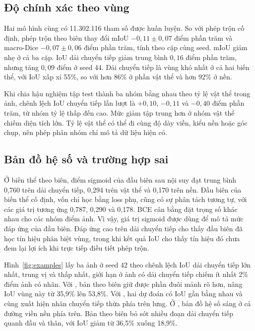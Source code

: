 \subsection{Độ chính xác theo vùng}

Hai mô hình cùng có 11.302.116 tham số được huấn luyện. So với phép trộn cố định, phép trộn theo biên thay đổi mIoU $-0{,}11\pm0{,}07$ điểm phần trăm và macro-Dice $-0{,}07\pm0{,}06$ điểm phần trăm, tính theo cặp cùng seed. mIoU giảm nhẹ ở cả ba cặp. IoU dải chuyển tiếp giảm trung bình $0{,}16$ điểm phần trăm, nhưng tăng $0{,}09$ điểm ở seed 44. Dải chuyển tiếp là vùng khó nhất ở cả hai biến thể, với IoU xấp xỉ 55\%, so với hơn 86\% ở phần vật thể và hơn 92\% ở nền.

Khi chia hậu nghiệm tập test thành ba nhóm bằng nhau theo tỷ lệ vật thể trong ảnh, chênh lệch IoU chuyển tiếp lần lượt là $+0{,}10$, $-0{,}11$ và $-0{,}40$ điểm phần trăm, từ nhóm tỷ lệ thấp đến cao. Mức giảm tập trung hơn ở nhóm vật thể chiếm diện tích lớn. Tỷ lệ vật thể có thể đi cùng độ dày viền, kiểu nền hoặc góc chụp, nên phép phân nhóm chỉ mô tả dữ liệu hiện có.

\subsection{Bản đồ hệ số và trường hợp sai}

Ở biến thể theo biên, điểm sigmoid của đầu biên sau nội suy đạt trung bình 0,760 trên dải chuyển tiếp, 0,294 trên vật thể và 0,170 trên nền. Đầu biên của biến thể cố định, vốn chỉ học bằng loss phụ, cũng có sự phân tách tương tự, với các giá trị tương ứng 0,787, 0,290 và 0,178. BCE cân bằng đặt trọng số khác nhau cho các nhóm điểm ảnh. Vì vậy, giá trị sigmoid được dùng để mô tả mức đáp ứng của đầu biên. Đáp ứng cao trên dải chuyển tiếp cho thấy đầu biên đã học tín hiệu phân biệt vùng, trong khi kết quả IoU cho thấy tín hiệu đó chưa đem lại lợi ích khi trực tiếp điều tiết phép trộn.

Hình~\ref{fig:examples} lấy ba ảnh ở seed 42 theo chênh lệch IoU dải chuyển tiếp lớn nhất, trung vị và thấp nhất, giới hạn ở ảnh có dải chuyển tiếp chiếm ít nhất 2\% điểm ảnh có nhãn. Với , bản theo biên giữ được phần đuôi mảnh rõ hơn, nâng IoU vùng này từ 35,9\% lên 53,8\%. Với , hai dự đoán có IoU gần bằng nhau và cùng xuất hiện nhãn chuyển tiếp thừa phía trên lưng. Ở , bản đồ hệ số sáng ở cả đường viền nền phía trên. Bản theo biên bỏ sót nhiều đoạn dải chuyển tiếp quanh đầu và thân, với IoU giảm từ 36,5\% xuống 18,9\%.


